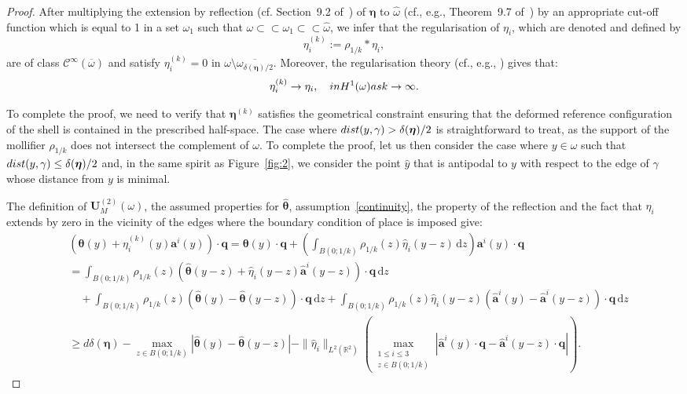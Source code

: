 \documentclass{amsart}
\def\dd{\, \mathrm{d}}
\begin{document}
\begin{proof}
	After multiplying the extension by reflection (cf. Section~9.2 of~\cite{Brez11}) of $\bm{\eta}$ to $\hat{\omega}$ (cf., e.g., Theorem~9.7 of~\cite{Brez11}) by an appropriate cut-off function which is equal to 1 in a set $\omega_1$ such that $\omega \subset\subset\omega_1 \subset\subset\hat{\omega}$, we infer that the regularisation of $\eta_i$, which are denoted and defined by
	\begin{equation*}
		\eta_i^{(k)}:=\rho_{1/k} \ast \eta_i,
	\end{equation*}
	are of class $\mathcal{C}^\infty(\overline{\omega})$ and satisfy $\eta_i^{(k)}=0$ in $\omega\setminus\overline{\omega_{\delta(\bm{\eta})/2}}$. Moreover, the regularisation theory (cf., e.g., \cite{Brez11}) gives that:
	\begin{equation*}
		\eta_i^{(k)} \to \eta_i,\quad\textup{ in }H^1(\omega)\textup{ as }k\to\infty.
	\end{equation*}
	
	To complete the proof, we need to verify that $\bm{\eta}^{(k)}$ satisfies the geometrical constraint ensuring that the deformed reference configuration of the shell is contained in the prescribed half-space. The case where $\textup{dist}(y,\gamma)>\delta(\bm{\eta})/2$ is straightforward to treat, as the support of the mollifier $\rho_{1/k}$ does not intersect the complement of $\omega$. To complete the proof, let us then consider the case where $y\in \omega$ such that $\textup{dist}(y,\gamma)\le\delta(\bm{\eta})/2$ and, in the same spirit as Figure~\ref{fig:2}, we consider the point $\hat{y}$ that is antipodal to $y$ with respect to the edge of $\gamma$ whose distance from $y$ is minimal. 
	
	The definition of $\bm{U}_M^{(2)}(\omega)$, the assumed properties for $\hat{\bm{\theta}}$, assumption~\eqref{continuity}, the property of the reflection and the fact that $\eta_i$ extends by zero in the vicinity of the edges where the boundary condition of place is imposed give:
	\begin{equation}
		\label{est:6}
		\begin{aligned}
			&\left(\bm{\theta}(y)+\eta_i^{(k)}(y)\bm{a}^i(y)\right)\cdot\bm{q}
			=\bm{\theta}(y)\cdot\bm{q}+\left(\int_{B(0;1/k)} \rho_{1/k}(z) \hat{\eta}_i(y-z) \dd z\right)\bm{a}^i(y)\cdot\bm{q}\\
			&=\int_{B(0;1/k)}\rho_{1/k}(z)\left(\hat{\bm{\theta}}(y-z)+\hat{\eta}_i(y-z)\hat{\bm{a}}^i(y-z)\right) \cdot\bm{q}\dd z\\
			&\quad+\int_{B(0;1/k)}\rho_{1/k}(z)(\hat{\bm{\theta}}(y)-\hat{\bm{\theta}}(y-z))\cdot\bm{q}\dd z
			+\int_{B(0;1/k)}\rho_{1/k}(z)\hat{\eta}_i(y-z)(\hat{\bm{a}}^i(y)-\hat{\bm{a}}^i(y-z))\cdot\bm{q}\dd z\\
			&\ge d\delta(\bm{\eta})-\max_{z\in B(0;1/k)}|\hat{\bm{\theta}}(y)-\hat{\bm{\theta}}(y-z)|-\|\hat{\eta}_i\|_{L^2(\mathbb{R}^2)}\left(\max_{\substack{1\le i\le3\\z\in B(0;1/k)}}\left|\hat{\bm{a}}^i(y)\cdot\bm{q}-\hat{\bm{a}}^i(y-z)\cdot\bm{q}\right|\right).
		\end{aligned}
	\end{equation}
	

\end{proof}
\end{document}
